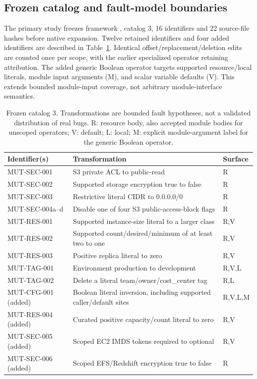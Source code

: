 \subsection{Frozen catalog and fault-model boundaries}\label{sec:operators}
The primary study freezes framework , catalog 3, 16 identifiers and 22 source-file hashes before native expansion. Twelve retained identifiers and four added identifiers are described in Table~\ref{tab:operators}. Identical offset/replacement/deletion edits are counted once per scope, with the earlier specialized operator retaining attribution. The added generic Boolean operator targets supported resource/local literals, module input arguments (M), and scalar variable defaults (V). This extends bounded module-input coverage, not arbitrary module-interface semantics.

\begin{table}[ht]
\caption{Frozen catalog 3. Transformations are bounded fault hypotheses, not a validated distribution of real bugs. R: resource body, also accepted module bodies for unscoped operators; V: default; L: local; M: explicit module-argument label for the generic Boolean operator.}\label{tab:operators}
\small\begin{tabularx}{\linewidth}{@{}p{3.05 cm}X p{1.3 cm}@{}}\toprule
Identifier(s) & Transformation & Surface\\\midrule
MUT-SEC-001 & S3 private ACL to public-read & R\\
MUT-SEC-002 & Supported storage encryption true to false & R\\
MUT-SEC-003 & Restrictive literal CIDR to 0.0.0.0/0 & R\\
MUT-SEC-004a--d & Disable one of four S3 public-access-block flags & R\\
MUT-RES-001 & Supported instance-size literal to a larger class & R,V\\
MUT-RES-002 & Supported count/desired/minimum of at least two to one & R,V\\
MUT-RES-003 & Positive replica literal to zero & R,V\\
MUT-TAG-001 & Environment production to development & R,V,L\\
MUT-TAG-002 & Delete a literal team/owner/cost\_center tag & R,L\\\midrule
MUT-CFG-001 (added) & Boolean literal inversion, including supported caller/default sites & R,V,L,M\\
MUT-RES-004 (added) & Curated positive capacity/count literal to zero & R,V\\
MUT-SEC-005 (added) & Scoped EC2 IMDS tokens required to optional & R,V\\
MUT-SEC-006 (added) & Scoped EFS/Redshift encryption true to false & R\\\bottomrule
\end{tabularx}\end{table}

